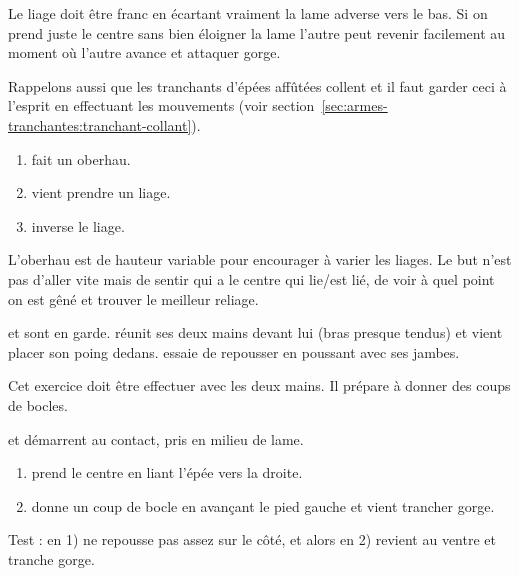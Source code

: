 Le liage doit être franc en écartant vraiment la lame adverse vers le bas. Si on prend juste le centre sans bien éloigner la lame l'autre peut revenir facilement au moment où l'autre avance et attaquer gorge.

Rappelons aussi que les tranchants d'épées affûtées collent et il faut garder ceci à l'esprit en effectuant les mouvements (voir section~\ref{sec:armes-tranchantes:tranchant-collant}).


\begin{exercice}[Liages]

\begin{enumerate}
	\item \A fait un oberhau.
	\item \D vient prendre un liage.
	\item \A inverse le liage.
\end{enumerate}

L'oberhau est de hauteur variable pour encourager \D à varier les liages.
Le but n'est pas d'aller vite mais de sentir qui a le centre qui lie/est lié, de voir à quel point on est gêné et trouver le meilleur reliage.
\end{exercice}


\begin{exercice}
\A et \D sont en garde.
\D réunit ses deux mains devant lui (bras presque tendus) et \A vient placer son poing dedans.
\A essaie de repousser \D en poussant avec ses jambes.

Cet exercice doit être effectuer avec les deux mains.
Il prépare à donner des coups de bocles.

\end{exercice}


\begin{technique}

\A et \D démarrent au contact, pris en milieu de lame.

\begin{enumerate}
	\item \A prend le centre en liant l'épée vers la droite.
	\item \A donne un coup de bocle en avançant le pied gauche et vient trancher gorge.
\end{enumerate}

Test : en 1) \A ne repousse pas assez sur le côté, et alors en 2) \D revient au ventre et tranche gorge.

\end{technique}


